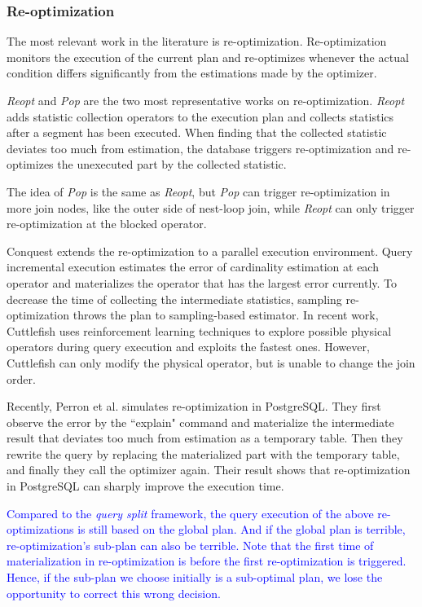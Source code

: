     \subsubsection{Re-optimization} The most relevant work in the literature is re-optimization. Re-optimization monitors the execution of the current plan and re-optimizes whenever the actual condition differs significantly from the estimations made by the optimizer.\par
    \textit{Reopt} \cite{Reopt} and \textit{Pop} \cite{Pop} are the two most representative works on re-optimization. \textit{Reopt} adds statistic collection operators to the execution plan and collects statistics after a segment has been executed. When finding that the collected statistic deviates too much from estimation, the database triggers re-optimization and re-optimizes the unexecuted part by the collected statistic.\par
    The idea of \textit{Pop} is the same as \textit{Reopt}, but \textit{Pop} can trigger re-optimization in more join nodes, like the outer side of nest-loop join, while \textit{Reopt} can only trigger re-optimization at the blocked operator.\par
    Conquest \cite{paper39} extends the re-optimization to a parallel execution environment. Query incremental execution \cite{QIE} estimates the error of cardinality estimation at each operator and materializes the operator that has the largest error currently. To decrease the time of collecting the intermediate statistics, sampling re-optimization \cite{SampleReopt} throws the plan to sampling-based estimator. In recent work, Cuttlefish \cite{paper29} uses reinforcement learning techniques to explore possible physical operators during query execution and exploits the fastest ones. However, Cuttlefish can only modify the physical operator, but is unable to change the join order.\par
    Recently, Perron et al. \cite{MichaelStonebraker} simulates re-optimization in PostgreSQL. They first observe the error by the ``explain" command and materialize the intermediate result that deviates too much from estimation as a temporary table. Then they rewrite the query by replacing the materialized part with the temporary table, and finally they call the optimizer again. Their result shows that re-optimization in PostgreSQL can sharply improve the execution time.\par
\textcolor{blue}{
    Compared to the \textit{query split} framework, the query execution of the above re-optimizations is still based on the global plan. And if the global plan is terrible, re-optimization's sub-plan can also be terrible. Note that the first time of materialization in re-optimization is before the first re-optimization is triggered. Hence, if the sub-plan we choose initially is a sub-optimal plan, we lose the opportunity to correct this wrong decision.
    }
    
